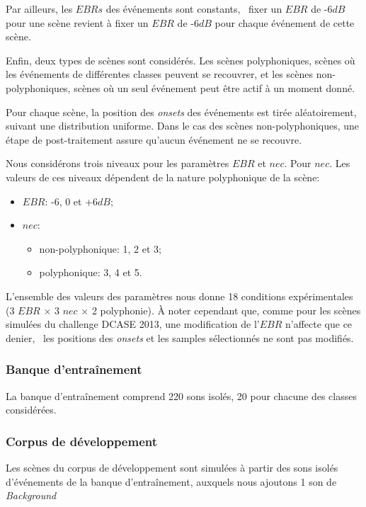 Par ailleurs, les $EBRs$ des événements sont constants, \ie~fixer un $EBR$ de -6$dB$ pour une scène revient à fixer un $EBR$ de -6$dB$ pour chaque événement de cette scène.

Enfin, deux types de scènes sont considérés. Les scènes polyphoniques, scènes où les événements de différentes classes peuvent se recouvrer, et les scènes non-polyphoniques, scènes où un seul événement peut être actif à un moment donné.

Pour chaque scène, la position des \emph{onsets} des événements est tirée aléatoirement, suivant une distribution uniforme. Dans le cas des scènes non-polyphoniques, une étape de post-traitement assure qu'aucun événement ne se recouvre.

Nous considérons trois niveaux pour les paramètres $EBR$ et $nec$. Pour $nec$. Les valeurs de ces niveaux dépendent de la nature polyphonique de la scène:

\begin{itemize}
\item $EBR$: -6, 0 et +6$dB$;
\item $nec$: 
\begin{itemize}
\item non-polyphonique: 1, 2 et 3;
\item polyphonique: 3, 4 et 5.
\end{itemize}
\end{itemize}

L'ensemble des valeurs des paramètres nous donne 18 conditions expérimentales (3 $EBR$ $\times$ 3 $nec$ $\times$ 2 polyphonie). À noter cependant que, comme pour les scènes simulées du challenge DCASE 2013, une modification de l'$EBR$ n'affecte que ce denier, \ie~les positions des \emph{onsets} et les samples sélectionnés ne sont pas modifiés.

\subsubsection{Banque d'entraînement}

La banque d’entraînement comprend 220 sons isolés, 20 pour chacune des classes considérées.

\subsubsection{Corpus de développement}

Les scènes du corpus de développement sont simulées à partir des sons isolés d'événements de la banque d’entraînement, auxquels nous ajoutons 1 son de \emph{Background}

